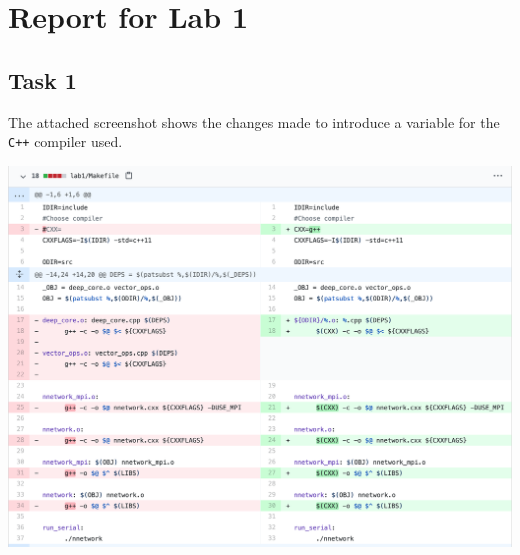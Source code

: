 \documentclass[a4paper, DIV12, headsepline]{scrartcl}
\begin{document}
\section*{Report for Lab 1}
\subsection*{Task 1}
The attached screenshot shows the changes made to introduce a variable for the \texttt{C++} compiler used.
\begin{center}
	\includegraphics[scale=0.3]{task1 diff.png}
\end{center}
\end{document}
